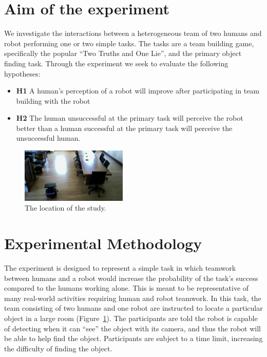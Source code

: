 \documentclass{acm_proc_article-sp}
\begin{document}
\section{Aim of the experiment}
\label{section:aim-of-the-experiment}
We investigate the interactions between a heterogeneous team of two humans and robot performing one or two simple tasks. The tasks are a team building game, specifically the popular ``Two Truths and One Lie'', and the primary object finding task. Through the experiment we seek to evaluate the following hypotheses:
\begin{itemize}
 \item \textbf{H1} A human's perception of a robot will improve after participating in team building with the robot
 \item \textbf{H2} The human unsuccessful at the primary task will perceive the robot better than a human successful at the primary task will perceive the unsuccessful human.
\end{itemize}

\begin{figure}[here]
\includegraphics[width=0.45\textwidth]{camera.png}
\caption{The location of the study.}
\label{fig:studylocation}
\end{figure}

\section{Experimental Methodology}
\label{experimental-methodology}
The experiment is designed to represent a simple task in which teamwork between humans and a robot would increase the probability of the task's success compared to the humans working alone. This is meant to be representative of many real-world activities requiring human and robot teamwork. In this task, the team consisting of two humans and one robot are instructed to locate a particular object in a large room (Figure~\ref{fig:studylocation}). The participants are told the robot is capable of detecting when it can ``see'' the object with its camera, and thus the robot will be able to help find the object. Participants are subject to a time limit, increasing the difficulty of finding the object.
\end{document}

